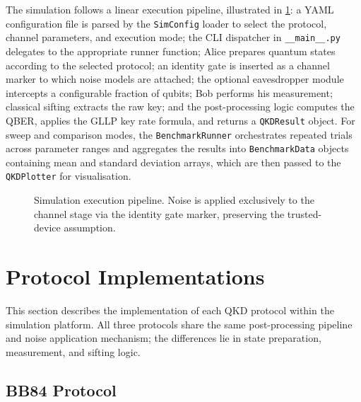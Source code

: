 \documentclass[10pt, a4paper]{report}
\begin{document}
The simulation follows a linear execution pipeline, illustrated in \cref{fig:pipeline}: a YAML configuration file is parsed by the \texttt{SimConfig} loader to select the protocol, channel parameters, and execution mode; the CLI dispatcher in \texttt{\_\_main\_\_.py} delegates to the appropriate runner function; Alice prepares quantum states according to the selected protocol; an identity gate is inserted as a channel marker to which noise models are attached; the optional eavesdropper module intercepts a configurable fraction of qubits; Bob performs his measurement; classical sifting extracts the raw key; and the post-processing logic computes the QBER, applies the GLLP key rate formula, and returns a \texttt{QKDResult} object. For sweep and comparison modes, the \texttt{BenchmarkRunner} orchestrates repeated trials across parameter ranges and aggregates the results into \texttt{BenchmarkData} objects containing mean and standard deviation arrays, which are then passed to the \texttt{QKDPlotter} for visualisation.

\begin{figure}[ht]
    \centering
    \caption{Simulation execution pipeline. Noise is applied exclusively to the channel stage via the identity gate marker, preserving the trusted-device assumption.}
    \label{fig:pipeline}
\end{figure}


\section{Protocol Implementations}

This section describes the implementation of each QKD protocol within the simulation platform. All three protocols share the same post-processing pipeline and noise application mechanism; the differences lie in state preparation, measurement, and sifting logic.

\subsection{BB84 Protocol}
\end{document}
